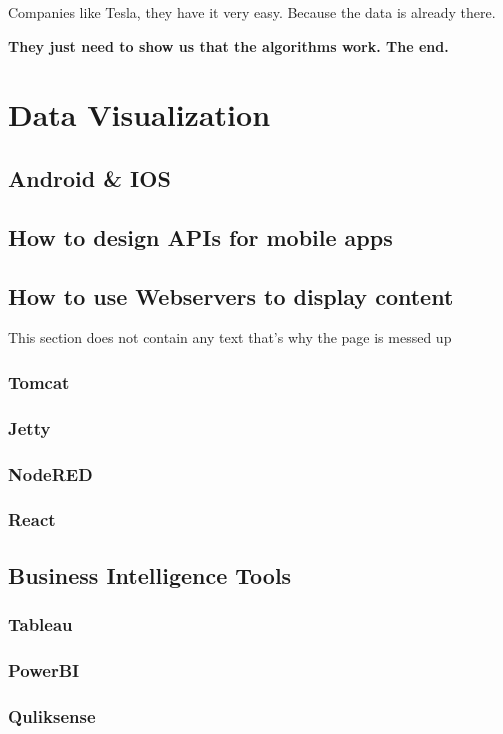 \documentclass[12pt, numbers=noenddot]{scrreprt} %
\begin{document}
Companies like Tesla, they have it very easy. Because the data is already there.

\textbf{They just need to show us that the algorithms work. The end.}


\chapter{Data Visualization}

\section{Android \& IOS }
\section{How to design APIs for mobile apps}

\section{How to use Webservers to display content}
This section does not contain any text that's why the page is messed up
\subsection{Tomcat}
\subsection{Jetty}
\subsection{NodeRED}
\subsection{React}

\section{Business Intelligence Tools}
\subsection{Tableau}
\subsection{PowerBI}
\subsection{Quliksense}
\end{document}
